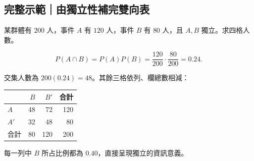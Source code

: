 \documentclass[11pt,a4paper]{article}
\newcounter{none}
\begin{document}
\begin{HandoutWorkedExample}

\subsection{完整示範｜由獨立性補完雙向表}\label{ux5b8cux6574ux793aux7bc4ux7531ux7368ux7acbux6027ux88dcux5b8cux96d9ux5411ux8868}

某群體有 \(200\) 人，事件 \(A\) 有 \(120\) 人，事件 \(B\) 有 \(80\) 人，且 \(A,B\) 獨立。求四格人數。

\[
P(A\cap B)=P(A)P(B)
=\frac{120}{200}\cdot\frac{80}{200}
=0.24.
\]

交集人數為 \(200(0.24)=48\)。其餘三格依列、欄總數相減：

{\def\LTcaptype{none} %
\begin{longtable}[]{@{}lrrr@{}}
\toprule\noalign{}
& \(B\) & \(B'\) & 合計 \\
\midrule\noalign{}
\endhead
\bottomrule\noalign{}
\endlastfoot
\(A\) & 48 & 72 & 120 \\
\(A'\) & 32 & 48 & 80 \\
合計 & 80 & 120 & 200 \\
\end{longtable}
}

每一列中 \(B\) 所占比例都為 \(0.40\)，直接呈現獨立的資訊意義。

\end{HandoutWorkedExample}
\end{document}
